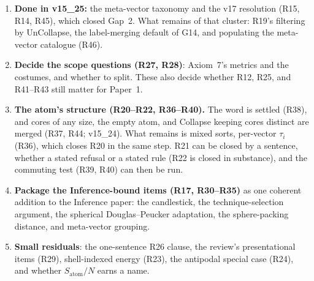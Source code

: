 \documentclass[11pt]{article}
\begin{document}
\begin{enumerate}
\item \textbf{Done in v15\_25:} the meta-vector taxonomy and the v17
resolution (R15, R14, R45), which closed Gap~2. What remains of that
cluster: R19's filtering by UnCollapse, the label-merging default of G14,
and populating the meta-vector catalogue (R46).
\item \textbf{Decide the scope questions (R27, R28)}: Axiom~7's
metrics and the costumes, and whether to split. These also decide
whether R12, R25, and R41--R43 still matter for Paper~1.
\item \textbf{The atom's structure (R20--R22, R36--R40).} The word
is settled (R38), and cores of any size, the empty atom, and
Collapse keeping cores distinct are merged (R37, R44; v15\_24). What
remains is mixed sorts, per-vector $\tau_i$ (R36), which closes R20 in
the same step. R21 can be closed by a
sentence, whether a stated refusal or a stated rule (R22 is closed in
substance), and the commuting test (R39, R40) can then be run.
\item \textbf{Package the Inference-bound items (R17, R30--R35)}
as one coherent addition to the Inference paper: the candlestick,
the technique-selection argument, the spherical Douglas--Peucker
adaptation, the sphere-packing distance, and meta-vector grouping.
\item \textbf{Small residuals}: the one-sentence R26 clause, the
review's presentational items (R29), shell-indexed energy (R23), the
antipodal special case (R24), and whether $S_{\text{atom}}/N$ earns a
name.
\end{enumerate}
\end{document}
